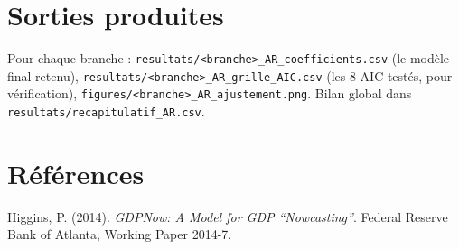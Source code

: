 \documentclass[11pt,a4paper]{article}
\begin{document}
\section{Sorties produites}

\begin{resultatbox}
Pour chaque branche : \texttt{resultats/<branche>\_AR\_coefficients.csv} (le modèle final retenu), \texttt{resultats/<branche>\_AR\_grille\_AIC.csv} (les 8 AIC testés, pour vérification), \texttt{figures/<branche>\_AR\_ajustement.png}. Bilan global dans \texttt{resultats/recapitulatif\_AR.csv}.
\end{resultatbox}

\section*{Références}
\begin{enumerate}[leftmargin=1.6em, label=\textbf{[\arabic*]}]
\item \hypertarget{ref1}{} Higgins, P. (2014). \textit{GDPNow: A Model for GDP ``Nowcasting''}. Federal Reserve Bank of Atlanta, Working Paper 2014-7.
\end{enumerate}
\end{document}
